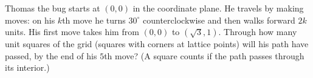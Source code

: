 Thomas the bug starts at $(0,0)$ in the coordinate plane. He travels by making moves: on his $k$th move he turns $30^\circ$ counterclockwise and then walks forward $2k$ units. His first move takes him from $(0,0)$ to $(\sqrt3,1)$. Through how many unit squares of the grid (squares with corners at lattice points) will his path have passed, by the end of his $5$th move? (A square counts if the path passes through its interior.)
